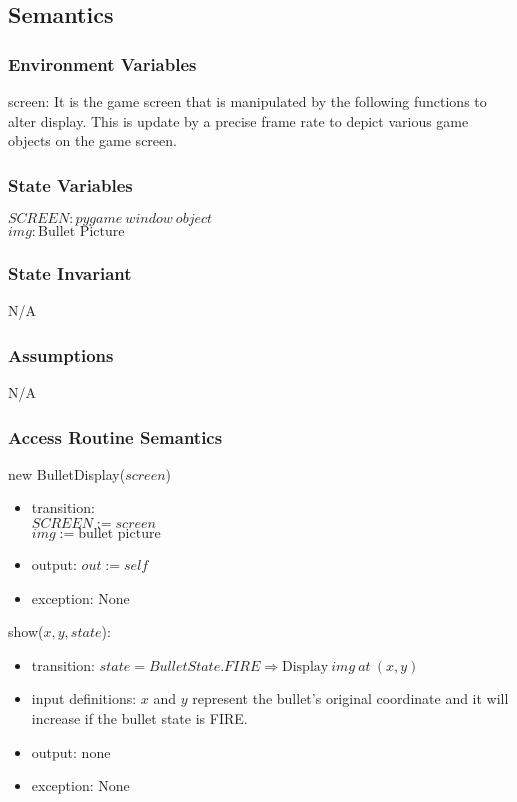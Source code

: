 \documentclass[12pt]{article}
\begin{document}
\subsection*{Semantics}
\subsubsection*{Environment Variables}
screen: It is the game screen that is manipulated by the following functions to alter display. This is update by a precise frame rate to depict various game objects on the game screen.
\subsubsection*{State Variables}
$SCREEN: pygame\ window\ object$\\
$img: \text{Bullet Picture}$
\subsubsection*{State Invariant}
N/A
\subsubsection*{Assumptions}
N/A
\subsubsection*{Access Routine Semantics}

new BulletDisplay($screen$)
\begin{itemize}
     \item transition: \\$SCREEN := screen$
    \\$img := \text{bullet picture}$
    \item output: $out := self$
    \item exception: None
\end{itemize}

\noindent show($x, y, state$):
\begin{itemize}
    \item transition: $state = BulletState.FIRE \Rightarrow \text{Display}\ img\ at\ (x, y)$
    \item input definitions: $x$ and $y$ represent the bullet's original coordinate and it will increase if the bullet state is FIRE.
     \item output: none
    \item exception: None
\end{itemize}
\newpage
\end{document}
